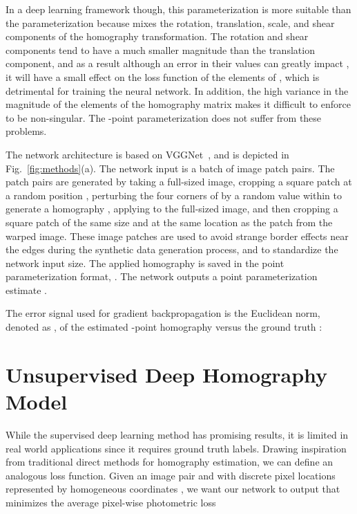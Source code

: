 \documentclass[letterpaper, 10 pt, conference]{ieeeconf}
\begin{document}
In a deep learning framework though, this parameterization is more suitable than the  parameterization  because  mixes the rotation, translation, scale, and shear components of the homography transformation. The rotation and shear components tend to have a much smaller magnitude than the translation component, and as a result although an error in their values can greatly impact , it will have a small effect on the  loss function of the elements of , which is detrimental for training the neural network. In addition, the high variance in the magnitude of the elements of the  homography matrix makes it difficult to enforce  to be non-singular. The -point parameterization does not suffer from these problems.

The network architecture is based on VGGNet~\cite{simonyan2014very}, and is depicted in Fig.~\ref{fig:methods}(a). The network input is a batch of image patch pairs. The patch pairs are generated by taking a full-sized image, cropping a square patch  at a random position , perturbing the four corners of by a random value within  to generate a homography , applying  to the full-sized image, and then cropping a square patch  of the same size and at the same location as the patch  from the warped image. These image patches are used to avoid strange border effects near the edges during the synthetic data generation process, and to standardize the network input size. The applied homography  is saved in the  point parameterization format, . The network outputs a   point parameterization estimate .

The error signal used for gradient backpropagation is the Euclidean  norm, denoted as , of the estimated -point homography  versus the ground truth :









 \section{Unsupervised Deep Homography Model}
\label{sec:method}
While the supervised deep learning method has promising results, it is limited in real world applications since it requires ground truth labels. Drawing inspiration from traditional direct methods for homography estimation, we can define an analogous loss function. Given an image pair  and  with discrete pixel locations represented by homogeneous coordinates , we want our network to output  that minimizes the average  pixel-wise photometric loss
\end{document}
